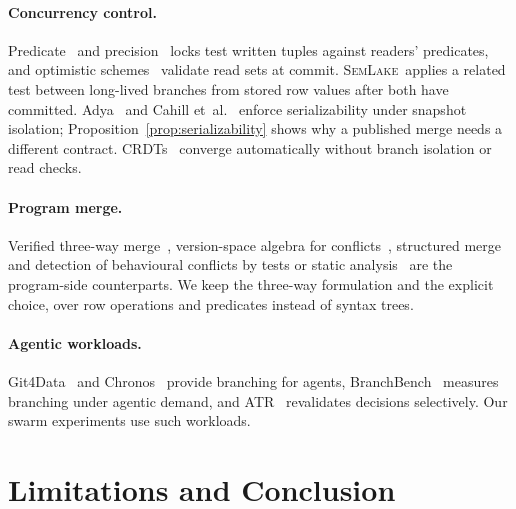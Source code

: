 \documentclass[sigconf, nonacm]{acmart}
\newcommand{\systemname}{\textsc{SemLake}}
\begin{document}
\paragraph{Concurrency control.}
Predicate~\cite{eswaran1976notions} and precision~\cite{jordan1981precision} locks test written tuples against readers' predicates, and optimistic schemes~\cite{kung1981optimistic, larson2011hekaton} validate read sets at commit. \systemname\ applies a related test between long-lived branches from stored row values after both have committed. Adya~\cite{adya1999weak} and Cahill et~al.~\cite{cahill2008serializable} enforce serializability under snapshot isolation; Proposition~\ref{prop:serializability} shows why a published merge needs a different contract. CRDTs~\cite{almeida2024crdt, faria2025crdv} converge automatically without branch isolation or read checks.

\paragraph{Program merge.}
Verified three-way merge~\cite{sousa2018verified}, version-space algebra for conflicts~\cite{zhu2018conflict}, structured merge~\cite{zhu2024methodology} and detection of behavioural conflicts by tests or static analysis~\cite{dasilva2024detecting, dejesus2024lightweight} are the program-side counterparts. We keep the three-way formulation and the explicit choice, over row operations and predicates instead of syntax trees.

\paragraph{Agentic workloads.}
Git4Data~\cite{git4data2026} and Chronos~\cite{zhou2026chronos} provide branching for agents, BranchBench~\cite{ang2026branchbench} measures branching under agentic demand, and ATR~\cite{lyu2026atr} revalidates decisions selectively. Our swarm experiments use such workloads.

\section{Limitations and Conclusion}
\label{sec:conclusion}
\end{document}
